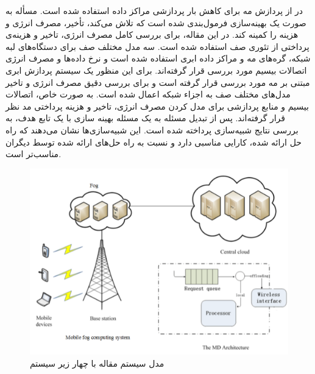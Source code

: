     در \cite{liu2017multiobjective} از پردازش مه برای کاهش بار پردازشی مراکز داده استفاده شده است.
    مسأله به صورت یک بهینه‌سازی فرمول‌بندی شده است که تلاش می‌کند، تأخیر، مصرف انرژی و هزینه را کمینه کند.
    در این مقاله، برای بررسی کامل مصرف انرژی، تاخیر و هزینه‌ی پرداختی از تئوری صف استفاده شده است.
    سه مدل مختلف صف برای دستگاه‌های لبه شبکه، گره‌های مه و مراکز داده ابری استفاده شده است و نرخ داده‌ها و مصرف انرژی اتصالات بیسیم مورد بررسی قرار گرفته‌اند.
    برای این منظور یک سیستم پردازش ابری مبتنی بر مه مورد بررسی قرار گرفته است و برای بررسی دقیق مصرف انرژی و تاخیر مدل‌های مختلف صف به اجزاء شبکه اعمال شده است.
    به صورت خاص، اتصالات بیسیم و منابع پردازشی برای مدل کردن مصرف انرژی، تاخیر و هزینه پرداختی مد نظر قرار گرفته‌اند.
    پس از تبدیل مسئله به یک مسئله بهینه سازی با یک تابع هدف، به بررسی نتایج شبیه‌سازی پرداخته شده است.
    این شبیه‌سازی‌ها نشان می‌دهند که راه حل ارائه شده، کارایی مناسبی دارد و نسبت به راه حل‌های ارائه شده توسط دیگران مناسب‌تر است.

    \begin{figure}[h]
      \centerline{\includegraphics[width=12cm]{graphics/chapter_2/system_model_liu2017multiobjective}}
      \caption{مدل سیستم مقاله \cite{liu2017multiobjective} با چهار زیر سیستم}
      \label{fig:chapter_2:system_model_liu2017multiobjective}
    \end{figure}

